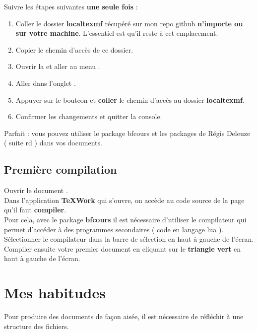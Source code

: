 \documentclass[a4paper,11pt,fleqn]{article}
\begin{document}
Suivre les étapes suivantes \textbf{une seule fois} :
\begin{enumerate}
	\item Coller le dossier \textbf{localtexmf} récupéré sur mon repo github \textbf{n'importe ou sur votre machine}. L'essentiel est qu'il reste à cet emplacement. \\
	\item Copier le chemin d'accès de ce dossier. \\
	\item Ouvrir la  et aller au menu .
	\item Aller dans l'onglet .
	\item Appuyer sur le bouteon \frquote{+} et \textbf{coller} le chemin d'accès au dossier \textbf{localtexmf}.
	\item Confirmer les changements et quitter la console. 
\end{enumerate}

Parfait : vous pouvez utiliser le package bfcours et les packages de Régis Deleuze ( suite rd ) dans vos documents. 

\subsection{Première compilation}

Ouvrir le document . \\
Dans l'application \textbf{TeXWork} qui s'ouvre, on accède au code source de la page qu'il faut \textbf{compiler}.\\

Pour cela, avec le package \textbf{bfcours} il est nécessaire d'utiliser le compilateur  qui permet d'accéder à des programmes secondaires ( code en langage lua ).\\
Sélectionner le compilateur  dans la barre de sélection en haut à gauche de l'écran. \\
Compiler ensuite votre premier document en cliquant sur le \textbf{triangle vert} en haut à gauche de l'écran. \\


\section{Mes habitudes}

Pour produire des documents de façon aisée, il est nécessaire de réfléchir à une structure des fichiers. \\
\end{document}
